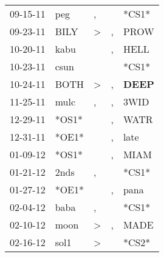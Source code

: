 \begin{supertabular}{p{0.07\textwidth}p{0.06\textwidth}p{0.02\textwidth}p{0.02\textwidth}p{0.06\textwidth}}
          09-15-11\textsuperscript{} &            peg\textsuperscript{} &                , &                  &                            *CS1* \\
          09-23-11\textsuperscript{} &           BILY\textsuperscript{} &     \textgreater &                , &           PROW\textsuperscript{} \\
          10-20-11\textsuperscript{} &           kabu\textsuperscript{} &                  &                , &           HELL\textsuperscript{} \\
          10-23-11\textsuperscript{} &           csun\textsuperscript{} &                  &                  &                            *CS1* \\
          10-24-11\textsuperscript{} &           BOTH\textsuperscript{} &     \textgreater &                , &  \textbf{DEEP\textsuperscript{}} \\
          11-25-11\textsuperscript{} &           mulc\textsuperscript{} &                , &                , &           3WID\textsuperscript{} \\
          12-29-11\textsuperscript{} &                            *OS1* &                  &                , &           WATR\textsuperscript{} \\
          12-31-11\textsuperscript{} &                            *OE1* &                  &                , &           late\textsuperscript{} \\
          01-09-12\textsuperscript{} &                            *OS1* &                  &                , &           MIAM\textsuperscript{} \\
          01-21-12\textsuperscript{} &           2nds\textsuperscript{} &                , &                  &                            *CS1* \\
          01-27-12\textsuperscript{} &                            *OE1* &                  &                , &           pana\textsuperscript{} \\
          02-04-12\textsuperscript{} &           baba\textsuperscript{} &                , &                  &                            *CS1* \\
          02-10-12\textsuperscript{} &           moon\textsuperscript{} &     \textgreater &                , &           MADE\textsuperscript{} \\
          02-16-12\textsuperscript{} &           sol1\textsuperscript{} &     \textgreater &                  &                            *CS2* \\

\end{supertabular}
